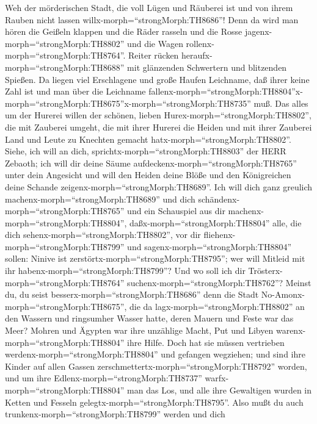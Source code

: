  Weh der mörderischen Stadt, die voll Lügen und Räuberei ist
und von ihrem Rauben nicht lassen willx-morph=``strongMorph:TH8686''!
 Denn da wird man hören die Geißeln klappen und die Räder
rasseln und die Rosse jagenx-morph=``strongMorph:TH8802'' und die Wagen
rollenx-morph=``strongMorph:TH8764''.  Reiter rücken
heraufx-morph=``strongMorph:TH8688'' mit glänzenden Schwertern und
blitzenden Spießen. Da liegen viel Erschlagene und große Haufen
Leichname, daß ihrer keine Zahl ist und man über die Leichname
fallenx-morph=``strongMorph:TH8804''\textbar x-morph=``strongMorph:TH8675''x-morph=``strongMorph:TH8735''
muß.  Das alles um der Hurerei willen der schönen, lieben
Hurex-morph=``strongMorph:TH8802'', die mit Zauberei umgeht, die mit
ihrer Hurerei die Heiden und mit ihrer Zauberei Land und Leute zu
Knechten gemacht hatx-morph=``strongMorph:TH8802''.  Siehe,
ich will an dich, sprichtx-morph=``strongMorph:TH8803'' der HERR
Zebaoth; ich will dir deine Säume
aufdeckenx-morph=``strongMorph:TH8765'' unter dein Angesicht und will
den Heiden deine Blöße und den Königreichen deine Schande
zeigenx-morph=``strongMorph:TH8689''.  Ich will dich ganz
greulich machenx-morph=``strongMorph:TH8689'' und dich
schändenx-morph=``strongMorph:TH8765'' und ein Schauspiel aus dir
machenx-morph=``strongMorph:TH8804'', 
daßx-morph=``strongMorph:TH8804'' alle, die dich
sehenx-morph=``strongMorph:TH8802'', vor dir
fliehenx-morph=``strongMorph:TH8799'' und
sagenx-morph=``strongMorph:TH8804'' sollen: Ninive ist
zerstörtx-morph=``strongMorph:TH8795''; wer will Mitleid mit ihr
habenx-morph=``strongMorph:TH8799''? Und wo soll ich dir
Trösterx-morph=``strongMorph:TH8764''
suchenx-morph=``strongMorph:TH8762''?  Meinst du, du seist
besserx-morph=``strongMorph:TH8686'' denn die Stadt
No-Amonx-morph=``strongMorph:TH8675'', die da
lagx-morph=``strongMorph:TH8802'' an den Wassern und ringsumher Wasser
hatte, deren Mauern und Feste war das Meer?  Mohren und
Ägypten war ihre unzählige Macht, Put und Libyen
warenx-morph=``strongMorph:TH8804'' ihre Hilfe.  Doch hat
sie müssen vertrieben werdenx-morph=``strongMorph:TH8804'' und gefangen
wegziehen; und sind ihre Kinder auf allen Gassen
zerschmettertx-morph=``strongMorph:TH8792'' worden, und um ihre
Edlenx-morph=``strongMorph:TH8737'' warfx-morph=``strongMorph:TH8804''
man das Los, und alle ihre Gewaltigen wurden in Ketten und Fesseln
gelegtx-morph=``strongMorph:TH8795''.  Also mußt du auch
trunkenx-morph=``strongMorph:TH8799'' werden und dich
